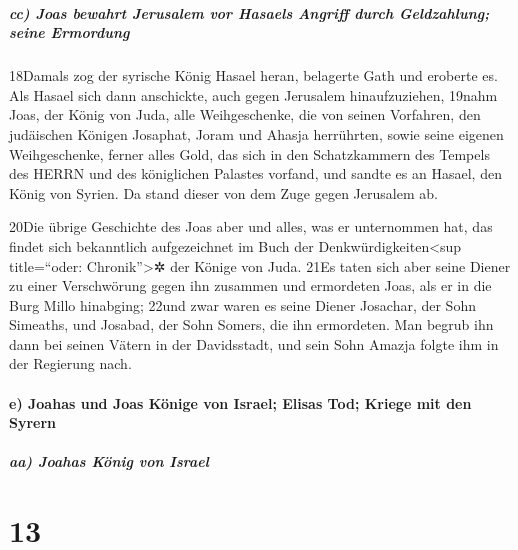 \hypertarget{cc-joas-bewahrt-jerusalem-vor-hasaels-angriff-durch-geldzahlung-seine-ermordung}{%
\subparagraph{cc) Joas bewahrt Jerusalem vor Hasaels Angriff durch
Geldzahlung; seine
Ermordung}\label{cc-joas-bewahrt-jerusalem-vor-hasaels-angriff-durch-geldzahlung-seine-ermordung}}

18Damals zog der syrische König Hasael heran, belagerte Gath und
eroberte es. Als Hasael sich dann anschickte, auch gegen Jerusalem
hinaufzuziehen, 19nahm Joas, der König von Juda, alle Weihgeschenke, die
von seinen Vorfahren, den judäischen Königen Josaphat, Joram und Ahasja
herrührten, sowie seine eigenen Weihgeschenke, ferner alles Gold, das
sich in den Schatzkammern des Tempels des HERRN und des königlichen
Palastes vorfand, und sandte es an Hasael, den König von Syrien. Da
stand dieser von dem Zuge gegen Jerusalem ab.

20Die übrige Geschichte des Joas aber und alles, was er unternommen hat,
das findet sich bekanntlich aufgezeichnet im Buch der
Denkwürdigkeiten\textless sup title=``oder: Chronik''\textgreater✲ der
Könige von Juda. 21Es taten sich aber seine Diener zu einer Verschwörung
gegen ihn zusammen und ermordeten Joas, als er in die Burg Millo
hinabging; 22und zwar waren es seine Diener Josachar, der Sohn Simeaths,
und Josabad, der Sohn Somers, die ihn ermordeten. Man begrub ihn dann
bei seinen Vätern in der Davidsstadt, und sein Sohn Amazja folgte ihm in
der Regierung nach.

\hypertarget{e-joahas-und-joas-kuxf6nige-von-israel-elisas-tod-kriege-mit-den-syrern}{%
\paragraph{e) Joahas und Joas Könige von Israel; Elisas Tod; Kriege mit
den
Syrern}\label{e-joahas-und-joas-kuxf6nige-von-israel-elisas-tod-kriege-mit-den-syrern}}

\hypertarget{aa-joahas-kuxf6nig-von-israel}{%
\subparagraph{aa) Joahas König von
Israel}\label{aa-joahas-kuxf6nig-von-israel}}

\hypertarget{section-12}{%
\section{13}\label{section-12}}

